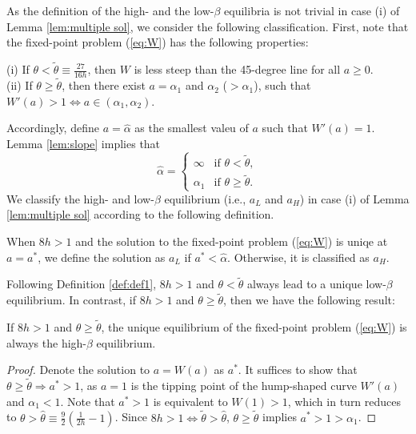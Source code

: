 As the definition of the high- and the low-$\beta$ equilibria is not trivial in case (i) of Lemma \ref{lem:multiple sol}, we consider the following classification. First, note that the fixed-point problem (\ref{eq:W}) has the following properties:
\begin{lemma}
\label{lem:slope}(i) If $\theta<\tilde{\theta}\equiv\frac{27}{16h}$, then $W$ is less steep than the 45-degree line for all $a\ge0$.\\
(ii) If $\theta\ge\tilde{\theta}$, then there exist $a=\alpha_{1}$ and $\alpha_{2}$ ($>\alpha_{1}$), such that $W'(a)>1\Leftrightarrow a\in(\alpha_{1},\alpha_{2})$. 
\end{lemma}
Accordingly, define $a=\hat{\alpha}$ as the smallest valeu of $a$ such that $W'(a)=1$. Lemma \ref{lem:slope} implies that 
\[
\hat{\alpha}=\begin{cases}
\infty & \text{if }\theta<\tilde{\theta},\\
\alpha_{1} & \text{if }\theta\ge\tilde{\theta}.
\end{cases}
\]
We classify the high- and low-$\beta$ equilibrium (i.e., $a_{L}$ and $a_{H}$) in case (i) of Lemma \ref{lem:multiple sol} according to the following definition.
\begin{definition}
\label{def:def1}When $8h>1$ and the solution to the fixed-point problem (\ref{eq:W}) is uniqe at $a=a^{*}$, we define the solution as $a_{L}$ if $a^{*}<\hat{\alpha}$. Otherwise, it is classified as $a_{H}$.
\end{definition}
Following Definition \ref{def:def1}, $8h>1$ and $\theta<\tilde{\theta}$ always lead to a unique low-$\beta$ equilibrium. In contrast, if $8h>1$ and $\theta\ge\tilde{\theta}$, then we have the following result:
\begin{lemma}
If $8h>1$ and $\theta\ge\tilde{\theta}$, the unique equilibrium of the fixed-point problem (\ref{eq:W}) is always the high-$\beta$ equilibrium.
\end{lemma}
\begin{proof}
Denote the solution to $a=W(a)$ as $a^{*}$. It suffices to show that $\theta\ge\tilde{\theta}\Rightarrow a^{*}>1$, as $a=1$ is the tipping point of the hump-shaped curve $W'(a)$ and $\alpha_{1}<1$. Note that $a^{*}>1$ is equivalent to $W(1)>1$, which in turn reduces to $\theta>\hat{\theta}\equiv\frac{9}{2}(\frac{1}{2h}-1)$. Since $8h>1\Leftrightarrow\tilde{\theta}>\hat{\theta}$, $\theta\ge\tilde{\theta}$ implies $a^{*}>1>\alpha_{1}$.
\end{proof}

